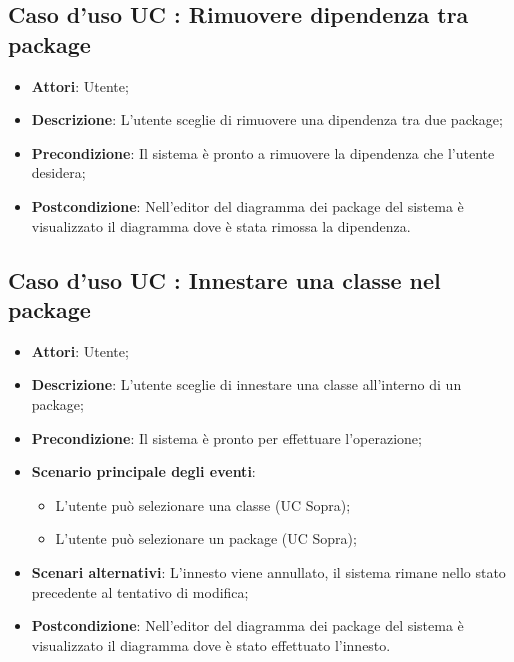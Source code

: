 \documentclass[../AnalisiDeiRequisiti.tex]{subfiles}
\begin{document}
		\subsection{Caso d'uso UC : Rimuovere dipendenza tra package}
			\begin{itemize}
				\item \textbf{Attori}: Utente;
				\item \textbf{Descrizione}: L'utente sceglie di rimuovere una dipendenza tra
				due package;
				\item \textbf{Precondizione}: Il sistema è pronto a rimuovere la dipendenza
				che l'utente desidera;
				\item \textbf{Postcondizione}: Nell'editor del diagramma dei package del
				sistema è visualizzato il diagramma dove è stata rimossa la dipendenza.
			\end{itemize}
		\subsection{Caso d'uso UC : Innestare una classe nel package}
			\begin{itemize}
				\item \textbf{Attori}: Utente;
				\item \textbf{Descrizione}: L'utente sceglie di innestare una classe
				all'interno di un package;
				\item \textbf{Precondizione}: Il sistema è pronto per effettuare l'operazione;
				\item \textbf{Scenario principale degli eventi}:
					\begin{itemize}
						\item L'utente può selezionare una classe (UC Sopra);
						\item L'utente può selezionare un package (UC Sopra);
					\end{itemize}
				\item \textbf{Scenari alternativi}: L'innesto viene annullato, il sistema
				rimane nello stato precedente al tentativo di modifica;
				\item \textbf{Postcondizione}: Nell'editor del diagramma dei package del
				sistema è visualizzato il diagramma dove è stato effettuato l'innesto.
			\end{itemize}
\end{document}

